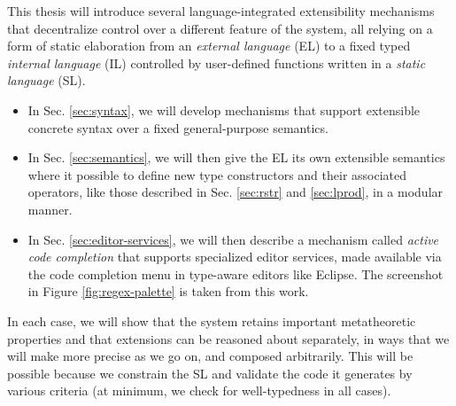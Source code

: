 

This thesis will introduce several language-integrated extensibility mechanisms that decentralize control over a different feature of the system, all relying on a form of static elaboration from an \emph{external language} (EL) to a fixed typed \emph{internal language} (IL) controlled by user-defined functions written in a \emph{static language} (SL).
\begin{itemize}
\item In Sec. \ref{sec:syntax}, we will develop mechanisms that support extensible concrete syntax over a fixed general-purpose semantics.
\item In Sec. \ref{sec:semantics}, we will then give the EL its own extensible  semantics where it possible to define new type constructors and their associated operators, like those described in Sec. \ref{sec:rstr} and \ref{sec:lprod}, in a modular manner.
\item In Sec. \ref{sec:editor-services}, we will then describe a mechanism called \emph{active code completion} that supports specialized editor services, made available via the code completion menu in type-aware editors like Eclipse. The screenshot in Figure \ref{fig:regex-palette} is taken from this work.
\end{itemize}

In each case, we will show that the system retains important metatheoretic properties and that extensions can be reasoned about separately, in ways that we will make more precise as we go on, and composed arbitrarily. This will be possible because we constrain the SL and validate the code it generates by various criteria (at minimum, we check for well-typedness in all cases). 

